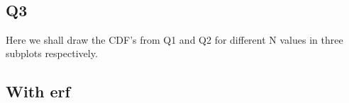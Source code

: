 \documentclass[11pt]{article}
\begin{document}
    \begin{center}
    \end{center}
    { \hspace*{\fill} \\}
    
    \hypertarget{q3}{%
\subsection{Q3}\label{q3}}

Here we shall draw the CDF's from Q1 and Q2 for different N values in
three subplots respectively.

    \hypertarget{with-erf}{%
\subsection{With erf}\label{with-erf}}
\end{document}

